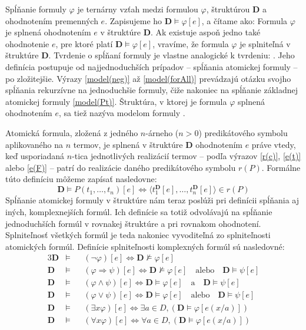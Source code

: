 \documentclass[12pt, letterpaper]{article}
\begin{document}
Spĺňanie formuly $\varphi$ je ternárny vzťah medzi formulou $\varphi$, štruktúrou \textbf{D} a ohodnotením premenných $e$. Zapisujeme ho $\mathbf{D}\models\varphi[e]$, a čítame ako: Formula $\varphi$ je splnená ohodnotením $e$ v štruktúre \textbf{D}. Ak existuje aspoň jedno také ohodnotenie $e$, pre ktoré platí $\mathbf{D}\models\varphi[e]$, vravíme, že formula $\varphi$ je splniteľná v štruktúre \textbf{D}. Tvrdenie o spĺňaní formuly je vlastne analogické k tvrdeniu: . Jeho definícia postupuje od najjednoduchších prípadov -- spĺňania atomickej formuly -- po zložitejšie. Výrazy \ref{model(neg)} až \ref{model(forAll)} prevádzajú otázku svojho spĺňania rekurzívne na jednoduchšie formuly, čiže nakoniec na spĺňanie základnej atomickej formuly \ref{model(Pt)}. Štruktúra, v ktorej je formula $\varphi$ splnená ohodnotením $e$, sa tiež nazýva modelom formuly \parencites[303]{peregrin_filosofie_2017}[50,52]{raclavsky_uvod_2015}{shapiro_classical_2022}[142--143]{svejdar_logika_2002}.\par
Atomická formula, zložená z jedného $n$-árneho ($n>0$) predikátového symbolu aplikovaného na $n$ termov, je splnená v štruktúre \textbf{D} ohodnotením $e$ práve vtedy, keď usporiadaná $n$-tica jednotlivých realizácií termov -- podľa výrazov \ref{r(c)}, \ref{e(t)} alebo \ref{e(F)} -- patrí do realizácie daného predikátového symbolu $r(P)$. Formálne túto definíciu môžeme zapísať nasledovne:
		\begin{equation}
			\mathbf{D} \models P(t_1,…, t_n)[e]	 \iff 	\langle t_{1}^{\mathbf{D}}[e],\dots, t_{n}^{\mathbf{D}}[e]\rangle \in r(P)		\label{model(Pt)}
		\end{equation}
Spĺňanie atomickej formuly v štruktúre nám teraz poslúži pri definícii spĺňania aj iných, komplexnejších formúl. Ich definície sa totiž odvolávajú na spĺňanie jednoduchších formúl v rovnakej štruktúre a pri rovnakom ohodnotení. Splniteľnosť všetkých formúl je teda nakoniec vyvoditeľná zo splniteľnosti atomických formúl. Definície splniteľnosti komplexných formúl sú nasledovné:
		\begin{alignat}{3}
			\mathbf{D} &\models&& (\neg\varphi)[e] 	 \iff	\mathbf{D} \not\models \varphi[e] \label{model(neg)} \\
			\mathbf{D} &\models&& (\varphi \Rightarrow \psi)[e] \iff \mathbf{D} \not\models \varphi[e] \quad \text{alebo} \quad\mathbf{D} \models \psi[e] \label{model(impl)}\\
			\mathbf{D} &\models&& (\varphi \land \psi)[e] \iff \mathbf{D} \models \varphi[e] \quad \text{a} \quad\mathbf{D} \models \psi[e] \label{model(a)}\\
			\mathbf{D} &\models&& (\varphi \lor \psi)[e] \iff \mathbf{D} \models \varphi[e] \quad \text{alebo} \quad\mathbf{D} \models \psi[e] \label{model(alebo)}\\
			\mathbf{D} &\models&& (\exists x\varphi)[e] \iff \exists a \in D, (\mathbf{D} \models \varphi[e(x/a)]) \label{model(exists)} \\
			\mathbf{D} &\models&& (\forall x\varphi)[e] \iff \forall a \in D, (\mathbf{D} \models \varphi[e(x/a)])	\label{model(forAll)}
		\end{alignat}
\end{document}
